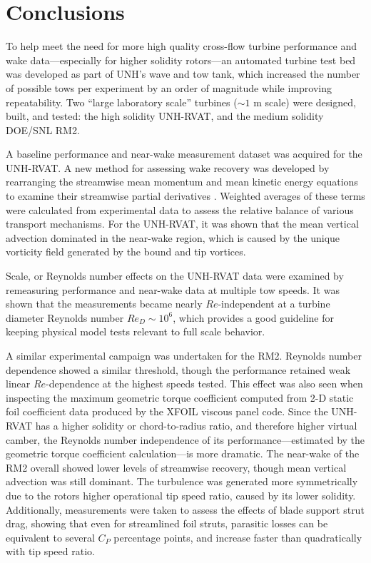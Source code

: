 \chapter{Conclusions}

To help meet the need for more high quality cross-flow turbine performance and
wake data---especially for higher solidity rotors---an automated turbine test
bed was developed as part of UNH's wave and tow tank, which increased the number
of possible tows per experiment by an order of magnitude while improving
repeatability. Two ``large laboratory scale'' turbines ($\sim 1$ m scale) were
designed, built, and tested: the high solidity UNH-RVAT, and the medium solidity
DOE/SNL RM2.

A baseline performance and near-wake measurement dataset was acquired for the
UNH-RVAT. A new method for assessing wake recovery was developed by rearranging
the streamwise mean momentum and mean kinetic energy equations to examine their
streamwise partial derivatives \cite{Bachant2015-JoT}. Weighted averages of
these terms were calculated from experimental data to assess the relative
balance of various transport mechanisms. For the UNH-RVAT, it was shown that the
mean vertical advection dominated in the near-wake region, which is caused by
the unique vorticity field generated by the bound and tip vortices.

Scale, or Reynolds number effects on the UNH-RVAT data were examined by
remeasuring performance and near-wake data at multiple tow speeds. It was shown
that the measurements became nearly $Re$-independent at a turbine diameter
Reynolds number $Re_D \sim 10^6$, which provides a good guideline for keeping
physical model tests relevant to full scale behavior.

A similar experimental campaign was undertaken for the RM2. Reynolds number
dependence showed a similar threshold, though the performance retained weak
linear $Re$-dependence at the highest speeds tested. This effect was also seen
when inspecting the maximum geometric torque coefficient computed from 2-D
static foil coefficient data produced by the XFOIL viscous panel code. Since the
UNH-RVAT has a higher solidity or chord-to-radius ratio, and therefore higher
virtual camber, the Reynolds number independence of its performance---estimated
by the geometric torque coefficient calculation---is more dramatic. The
near-wake of the RM2 overall showed lower levels of streamwise recovery, though
mean vertical advection was still dominant. The turbulence was generated more
symmetrically due to the rotors higher operational tip speed ratio, caused by
its lower solidity. Additionally, measurements were taken to assess the effects
of blade support strut drag, showing that even for streamlined foil struts,
parasitic losses can be equivalent to several $C_P$ percentage points, and
increase faster than quadratically with tip speed ratio.


